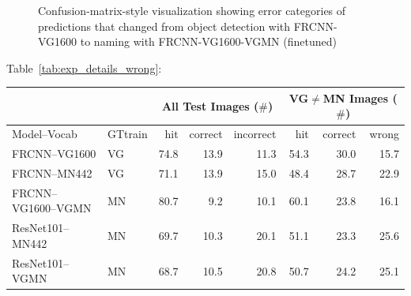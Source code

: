 \begin{figure}[t]
\caption{Confusion-matrix-style visualization showing error categories of predictions that changed from object detection with FRCNN-VG1600 to naming with FRCNN-VG1600-VGMN (finetuned)}
\end{figure}


Table\ \ref{tab:exp_details_wrong}: 

\begin{table}[t]
	\centering
	\small
	\begin{tabular}{l|l|r@{~}r@{~}r@{~}||r@{~}r@{~}r@{~}}
		\toprule
		& & \multicolumn{3}{c}{All Test Images ($\#$)} 
		& \multicolumn{3}{c}{VG$\neq$MN Images ($\#$)}\\
	\toprule
	Model--Vocab	& GTtrain  
	&  hit &  correct &  incorrect &  hit &  correct &  wrong \\
	\midrule
	FRCNN--VG1600 & VG           &         74.8 &                  13.9 &                    11.3 &         54.3 &                  30.0 &                    15.7 \\
	FRCNN--MN442 & VG &         71.1 &                  13.9 &                    15.0 &         48.4 &                  28.7 &                    22.9 \\
	\midrule \midrule
	FRCNN--VG1600--VGMN & MN %
	 &         80.7 &                   9.2 &                    10.1 &         60.1 &                  23.8 &                    16.1 \\
	\midrule
	ResNet101--MN442 & MN %
	 &         69.7 &                  10.3 &                    20.1 &         51.1 &                  23.3 &                    25.6 \\
	ResNet101--VGMN & MN%
	 &         68.7 &                  10.5 &                    20.8 &         50.7 &                  24.2 &                    25.1 \\

\end{tabular}
\end{table}

